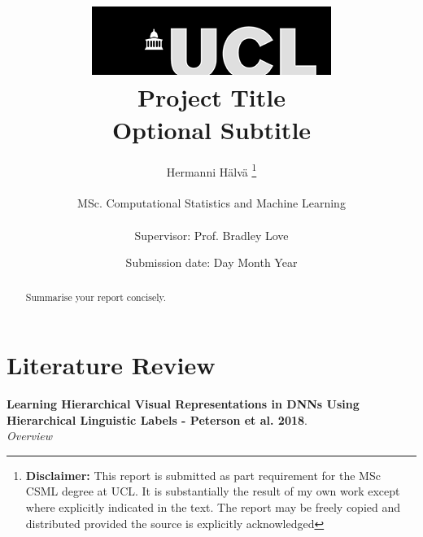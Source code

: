 \documentclass{report}
\title{  	{ \includegraphics[scale=.5]{ucl_logo.png}}\\
{{\Huge Project Title}}\\
{\large Optional Subtitle}\\
		}
\date{Submission date: Day Month Year}
\author{Hermanni H{\"a}lv{\"a} \thanks{
{\bf Disclaimer:}
This report is submitted as part requirement for the MSc CSML degree at UCL. It is
substantially the result of my own work except where explicitly indicated in the text.
The report may be freely copied and distributed provided the source is explicitly acknowledged
\newline  %
}
\\ \\
MSc. Computational Statistics and Machine Learning\\ \\
Supervisor: Prof. Bradley Love}
\begin{document}
 
 \onehalfspacing
\maketitle
\begin{abstract}
Summarise your report concisely.
\end{abstract}
\tableofcontents
\setcounter{page}{1}


\chapter{Literature Review}

\textbf{Learning Hierarchical Visual Representations in DNNs Using Hierarchical Linguistic Labels - Peterson et al. 2018}. \\ 
\textit{Overview} \\
\end{document}
